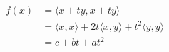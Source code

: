 \documentclass[preview]{standalone}
\begin{document}
\begin{align*}
f(x) & = \langle x + ty,x + ty \rangle \\& = \langle x,x \rangle + 2t \langle x,y \rangle + t^{2} \langle y,y \rangle \\&  = c+bt+at^{2}
\end{align*}
\end{document}
